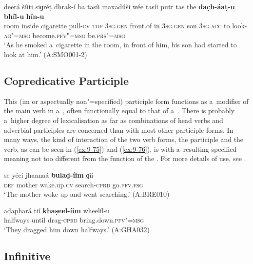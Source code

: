 \begin{exe}
\ex
\label{ex:9-74}
\gll deerá šíiṭi siɡréṭ dhrak-í ba tasíi maxadúši wée tasíi putr tas the \textbf{dac̣h-áaṭ-u} \textbf{bhíl-u} \textbf{hín-u} \\
room inside cigarette pull-\textsc{cv} \textsc{top} \textsc{3sg.gen} front.of in \textsc{3sg.gen} son \textsc{3sg.acc} to look-\textsc{ag"=msg} become.\textsc{pfv"=msg} be.\textsc{prs"=msg } \\
\glt `As he smoked a~cigarette in the room, in front of him, his son had started to look at him.' (A:SMO001-2)
\end{exe}

\subsection{Copredicative Participle}
\label{subsec:9-3-5}

This (im or aspectually non"=specified) participle form functions as a~modifier of the main verb in a~, often functionally equal to that of a~. There is probably a~higher degree of lexicalisation as far as combinations of head verbs and adverbial participles are concerned than with most other participle forms. In many ways, the kind of interaction of the two verb forms, the participle and the  verb, as can be seen in (\ref{ex:9-75}) and (\ref{ex:9-76}), is with a~resulting specified meaning not too different from the function of the . For more details of use, see . 

\begin{exe}
\ex
\label{ex:9-75}
\gll se yéei ǰhaanaá \textbf{bulaḍ-íim} ɡíi\\
\textsc{def} mother wake.up.\textsc{cv} search-\textsc{cprd} go.\textsc{pfv.fsg} \\
\glt `The mother woke up and went searching.' (A:BRE010)

\ex
\label{ex:9-76}
\gll aḍaphará tií \textbf{khaṣeel-íim} wheelíl-u\\
halfways until drag-\textsc{cprd} bring.down.\textsc{pfv"=msg} \\
\glt `They dragged him down halfways.' (A:GHA032)
\end{exe}

\subsection{Infinitive}
\label{subsec:9-3-6}

